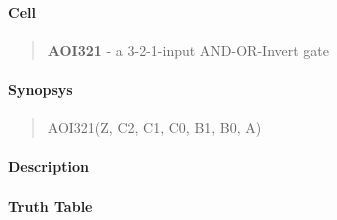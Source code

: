 \label{AOI321}
\paragraph{Cell}
\begin{quote}
    \textbf{AOI321} - a 3-2-1-input AND-OR-Invert gate
\end{quote}

\paragraph{Synopsys}
\begin{quote}
    AOI321(Z, C2, C1, C0, B1, B0, A)
\end{quote}

\paragraph{Description}

%

\paragraph{Truth Table}


